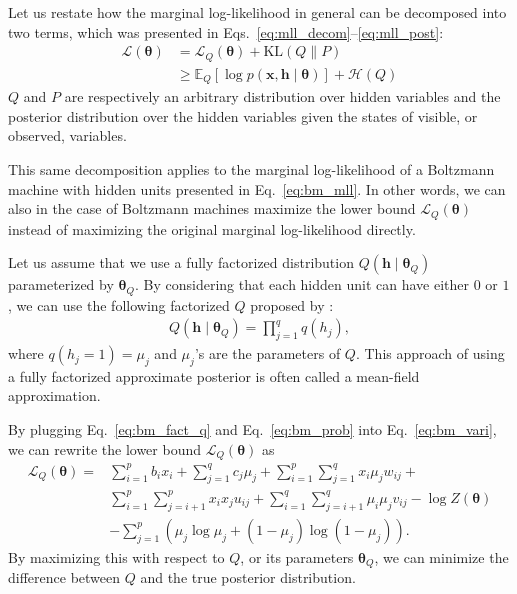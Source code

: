 \documentclass{now}
\newcommand{\vect}[1]{\mathbf{#1}}
\newcommand{\vects}[1]{\boldsymbol{#1}}
\newcommand{\vh}[0]{\vect{h}}
\newcommand{\vx}[0]{\vect{x}}
\newcommand{\TT}[0]{{\vects{\theta}}}
\newcommand{\LL}[0]{\mathcal{L}}
\newcommand{\HH}[0]{\mathcal{H}}
\newcommand{\KL}[0]{\text{KL}}
\newcommand{\E}[0]{\mathbb{E}}
\begin{document}
Let us 
restate how the marginal log-likelihood in
general can be decomposed into two terms, which was
presented in Eqs.~\eqref{eq:mll_decom}--\eqref{eq:mll_post}:
\begin{align}
    \label{eq:bm_vari}
    \LL(\TT) &= \LL_Q(\TT) + \KL(Q \| P) 
    \nonumber
    \\
    &\geq 
    \E_{Q} \left[ \log p(\vx, \vh \mid
    \TT)\right] + \HH(Q)
\end{align}
$Q$ and $P$ are respectively an arbitrary distribution
over hidden variables and the posterior distribution over
the hidden variables given the states of visible, or
observed, variables.

This same decomposition applies to the marginal
log-likelihood of a Boltzmann machine with hidden units
presented in Eq.~\eqref{eq:bm_mll}. In other words, we can
also in the case of Boltzmann machines maximize the
lower bound $\LL_Q(\TT)$ instead of maximizing the original
marginal log-likelihood directly.

Let us assume that we use a fully factorized distribution
$Q(\vh \mid \TT_Q)$ parameterized by $\TT_Q$. By considering
that each hidden unit can have either $0$ or $1$, we can use
the following factorized $Q$ proposed by
\citet{Salakhutdinov2009}:
\begin{align}
    \label{eq:bm_fact_q}
    Q(\vh \mid \TT_Q) = \prod_{j=1}^q q(h_j),
\end{align}
where $q(h_j = 1) = \mu_j$ and $\mu_j$'s are the parameters
of $Q$. This approach of using a fully factorized
approximate posterior is often called a mean-field approximation.

By plugging Eq.~\eqref{eq:bm_fact_q} and
Eq.~\eqref{eq:bm_prob} into Eq.~\eqref{eq:bm_vari}, we can
rewrite the lower bound $\LL_Q(\TT)$ as
\begin{align}
    \label{eq:bm_lowerbound}
    \LL_Q(\TT) =& \sum_{i=1}^p b_i x_i + \sum_{j=1}^q c_j
    \mu_j + \sum_{i=1}^p \sum_{j=1}^q x_i \mu_j w_{ij} + 
    \nonumber \\ 
    & \sum_{i=1}^p \sum_{j=i+1}^p x_i x_j u_{ij} +
    \sum_{i=1}^q \sum_{j=i+1}^q \mu_i \mu_j v_{ij} -\log
    Z(\TT) 
    \nonumber \\
    & - \sum_{j=1}^p \left( \mu_j \log \mu_j + (1
    - \mu_j) \log (1 - \mu_j)
    \right).
\end{align}
By maximizing this with respect to $Q$, or its
parameters $\TT_Q$, we can minimize the difference between
$Q$ and the true posterior distribution. 
\end{document}
